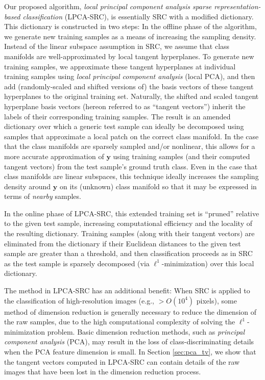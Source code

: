 \documentclass[review]{elsarticle}
\begin{document}
Our proposed algorithm, \emph{local principal component analysis sparse representation-based classification} (LPCA-SRC), is essentially SRC with a modified dictionary. This dictionary is constructed in two steps: In the offline phase of the algorithm, we generate new training samples as a means of increasing the sampling density. Instead of the linear subspace assumption in SRC, we assume that class manifolds are well-approximated by local tangent hyperplanes. To generate new training samples, we approximate these tangent hyperplanes at individual training samples using \emph{local principal component analysis} (local PCA), and then add (randomly-scaled and shifted versions of) the basis vectors of these tangent hyperplanes to the original training set. Naturally, the shifted and scaled tangent hyperplane basis vectors (hereon referred to as ``tangent vectors'') inherit the labels of their corresponding training samples. The result is an amended dictionary over which a generic test sample can ideally be decomposed using samples that approximate a local patch on the correct class manifold. In the case that the class manifolds are sparsely sampled and/or nonlinear, this allows for a more accurate approximation of $\bm{y}$ using training samples (and their computed tangent vectors) from the test sample's ground truth class. Even in the case that class manifolds are linear subspaces, this technique ideally increases the sampling density around $\bm{y}$ on its (unknown) class manifold so that it may be expressed in terms of \emph{nearby} samples. 



In the online phase of LPCA-SRC, this extended training set is ``pruned'' relative to the given test sample, increasing computational efficiency and the locality of the resulting dictionary. Training samples (along with their tangent vectors) are eliminated from the dictionary if their Euclidean distances to the given test sample are greater than a threshold, and then classification proceeds as in SRC as the test sample is sparsely decomposed (via $\ell^1$-minimization) over this local dictionary.

The method in LPCA-SRC has an additional benefit: When SRC is applied to the classification of high-resolution images (e.g., $>O(10^4)$ pixels), some method of dimension reduction is generally necessary to reduce the dimension of the raw samples, due to the high computational complexity of solving the $\ell^1$-minimization problem. Basic dimension reduction methods, such as \emph{principal component analysis} (PCA), may result in the loss of class-discriminating details when the PCA feature dimension is small. In Section \ref{sec:pca_tv}, we show that the tangent vectors computed in LPCA-SRC can contain details of the raw images that have been lost in the dimension reduction process. 
\end{document}
